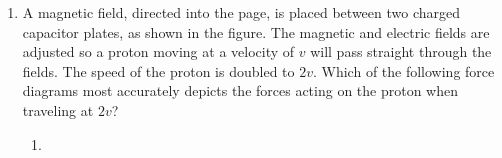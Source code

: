 \documentclass{../../../oss-classkick}
\begin{document}
\begin{multicols}{2}
\begin{enumerate}[leftmargin=18pt]
%
%
%    
  \item A magnetic field, directed into the page, is placed between two charged
    capacitor plates, as shown in the figure. The magnetic and electric fields
    are adjusted so a proton moving at a velocity of $v$ will pass straight
    through the fields. The speed of the proton is doubled to $2v$. Which of the
    following force diagrams most accurately depicts the forces acting on the
    proton when traveling at $2v$?
    \begin{center}
    \end{center}
    \begin{enumerate}[nosep,leftmargin=18pt,label=(\Alph*)]
    \item{}


\end{enumerate}
\end{enumerate}
\end{multicols}
\end{document}
